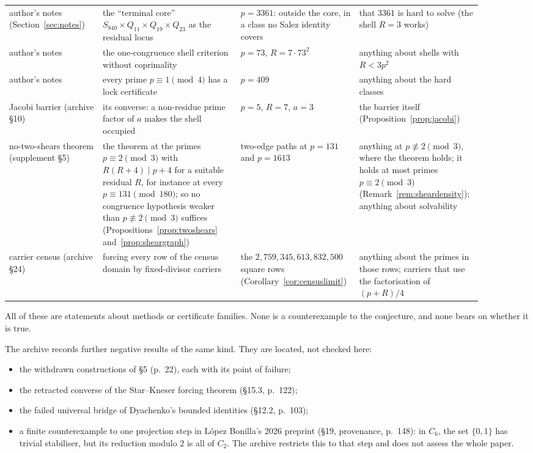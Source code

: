 \begin{center}
\begin{longtable}{@{}>{\raggedright\arraybackslash}p{0.19\linewidth}>{\raggedright\arraybackslash}p{0.29\linewidth}>{\raggedright\arraybackslash}p{0.21\linewidth}>{\raggedright\arraybackslash}p{0.21\linewidth}@{}}
author's notes (Section~\ref{sec:notes}) & the ``terminal core'' $S_{840}\times Q_{11}\times Q_{19}\times Q_{23}$ as the residual locus & $p=3361$: outside the core, in a class no Salez identity covers & that $3361$ is hard to solve (the shell $R=3$ works)\\
author's notes & the one-congruence shell criterion without coprimality & $p=73$, $R=7\cdot73^2$ & anything about shells with $R<3p^2$\\
author's notes & every prime $p\equiv1\pmod4$ has a lock certificate & $p=409$ & anything about the hard classes\\
Jacobi barrier (archive §10) & its converse: a non-residue prime factor of $a$ makes the shell occupied & $p=5$, $R=7$, $a=3$ & the barrier itself (Proposition~\ref{prop:jacobi})\\
no-two-shears theorem (supplement §5) & the theorem at the primes $p\equiv2\pmod3$ with $R(R+4)\mid p+4$ for a suitable residual $R$, for instance at every $p\equiv131\pmod{180}$; so no congruence hypothesis weaker than $p\not\equiv2\pmod3$ suffices (Propositions~\ref{prop:twoshears} and~\ref{prop:sheargraph}) & two-edge paths at $p=131$ and $p=1613$ & anything at $p\not\equiv2\pmod3$, where the theorem holds; it holds at most primes $p\equiv2\pmod3$ (Remark~\ref{rem:sheardensity}); anything about solvability\\
carrier census (archive §24) & forcing every row of the census domain by fixed-divisor carriers & the $2{,}759{,}345{,}613{,}832{,}500$ square rows (Corollary~\ref{cor:censuslimit}) & anything about the primes in those rows; carriers that use the factorisation of $(p+R)/4$\\
\bottomrule
\end{longtable}
\end{center}
All of these are statements about methods or certificate families. None is a counterexample to the conjecture, and none bears on whether it is true.

The archive records further negative results of the same kind. They are \textsf{located}, not checked here:
\begin{itemize}
\item the withdrawn constructions of §5 (p.~22), each with its point of failure;
\item the retracted converse of the Star--Kneser forcing theorem (§15.3, p.~122);
\item the failed universal bridge of Dyachenko's bounded identities (§12.2, p.~103);
\item a finite counterexample to one projection step in López Bonilla's 2026 preprint (§19, provenance, p.~148): in $C_6$, the set $\{0,1\}$ has trivial stabiliser, but its reduction modulo $2$ is all of $C_2$. The archive restricts this to that step and does not assess the whole paper.
\end{itemize}
